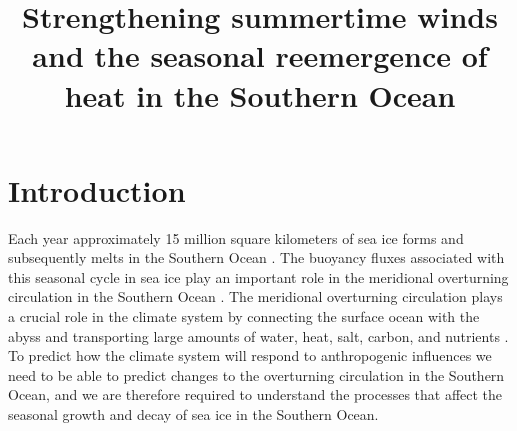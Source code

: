 \documentclass{ametsocV5}
\title{Strengthening summertime winds and the seasonal reemergence of heat in the Southern Ocean}
\affiliation{Earth, Atmospheric and Planetary Sciences,
Massachusetts Institute of Technology,
77 Massachusetts Avenue,
Cambridge, 02139,
USA}
\begin{document}
\maketitle

%
%
%


%


\section{Introduction}



Each year approximately 15 million square kilometers of sea ice forms and subsequently melts in the Southern Ocean \citep{Fetterer2016}. The buoyancy fluxes associated with this seasonal cycle in sea ice play an important role in the meridional overturning circulation in the Southern Ocean \citep{Abernathey2016,Haumann2016}. The meridional overturning circulation plays a crucial role in the climate system by connecting the surface ocean with the abyss and transporting large amounts of water, heat, salt, carbon, and nutrients \citep{Sarmiento2004}. To predict how the climate system will respond to anthropogenic influences we need to be able to predict changes to the overturning circulation in the Southern Ocean, and we are therefore required to understand the processes that affect the seasonal growth and decay of sea ice in the Southern Ocean.
\end{document}
